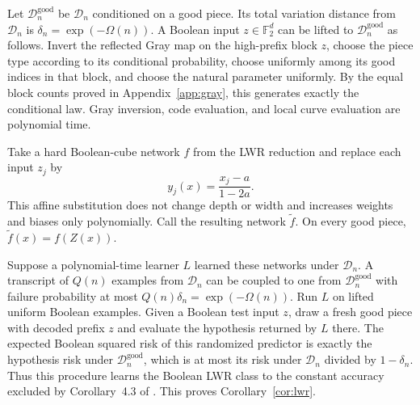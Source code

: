 \documentclass{article}
\theoremstyle{definition}
\theoremstyle{remark}
\newcommand{\Ftwo}{\mathbb F_2}
\newcommand{\cD}{\mathcal D}
\newcommand{\1}{\mathbf 1}
\begin{document}
Let $\cD_n^{\mathrm{good}}$ be $\cD_n$ conditioned on a good piece. Its total variation distance from $\cD_n$ is $\delta_n=\exp(-\Omega(n))$. A Boolean input $z\in\Ftwo^d$ can be lifted to $\cD_n^{\mathrm{good}}$ as follows. Invert the reflected Gray map on the high-prefix block $z$, choose the piece type according to its conditional probability, choose uniformly among its good indices in that block, and choose the natural parameter uniformly. By the equal block counts proved in Appendix~\ref{app:gray}, this generates exactly the conditional law. Gray inversion, code evaluation, and local curve evaluation are polynomial time.

Take a hard Boolean-cube network $f$ from the LWR reduction and replace each input $z_j$ by \[ y_j(x)=\frac{x_j-a}{1-2a}. \] This affine substitution does not change depth or width and increases weights and biases only polynomially. Call the resulting network $\widetilde f$. On every good piece, $\widetilde f(x)=f(Z(x))$.

Suppose a polynomial-time learner $L$ learned these networks under $\cD_n$. A transcript of $Q(n)$ examples from $\cD_n$ can be coupled to one from $\cD_n^{\mathrm{good}}$ with failure probability at most $Q(n)\delta_n=\exp(-\Omega(n))$. Run $L$ on lifted uniform Boolean examples. Given a Boolean test input $z$, draw a fresh good piece with decoded prefix $z$ and evaluate the hypothesis returned by $L$ there. The expected Boolean squared risk of this randomized predictor is exactly the hypothesis risk under $\cD_n^{\mathrm{good}}$, which is at most its risk under $\cD_n$ divided by $1-\delta_n$. Thus this procedure learns the Boolean LWR class to the constant accuracy excluded by Corollary~4.3 of \citet{chen2022noisefree}. This proves Corollary~\ref{cor:lwr}.
\end{document}
